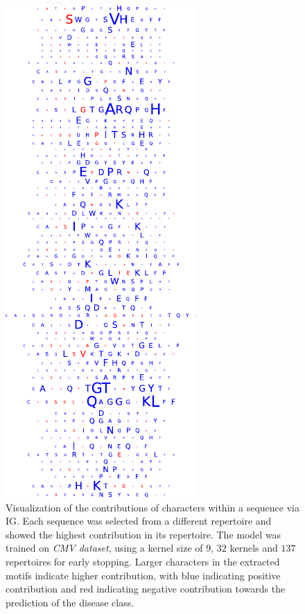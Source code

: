 \documentclass[oneside]{book}
\begin{document}
%

\begin{figure}[htp]
    \begin{center}
    \includegraphics[height=0.8\textheight]{figures/extracted_motifs/cmv_input_intgrds.pdf}
   \caption[Visualization of the contributions of AA]{
   Visualization of the contributions of characters within a sequence via IG.
   Each sequence was selected from a different repertoire and 
   showed the highest contribution in its repertoire.
   The model was trained on \emph{CMV dataset},
   using a kernel size of $9$, $32$ kernels
   and $137$ repertoires for early stopping.
    Larger characters in the extracted motifs indicate higher contribution,
    with blue indicating positive contribution and red indicating negative contribution towards the prediction of the disease class.
   \label{fig:ig_cmv_inputs}}
   \end{center}
\end{figure}
\end{document}
